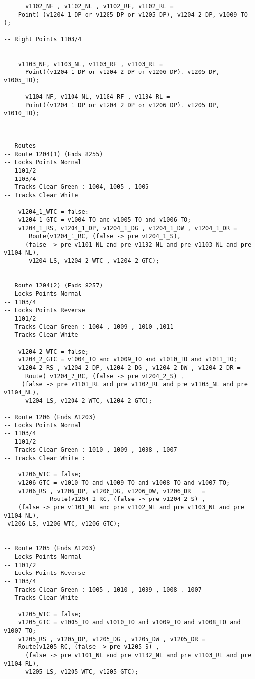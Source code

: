 \begin{verbatim}
      v1102_NF , v1102_NL , v1102_RF, v1102_RL =
 	Point( (v1204_1_DP or v1205_DP or v1205_DP), v1204_2_DP, v1009_TO );

-- Right Points 1103/4


	v1103_NF, v1103_NL, v1103_RF , v1103_RL =
      Point((v1204_1_DP or v1204_2_DP or v1206_DP), v1205_DP, v1005_TO);
	
      v1104_NF, v1104_NL, v1104_RF , v1104_RL =
      Point((v1204_1_DP or v1204_2_DP or v1206_DP), v1205_DP,  v1010_TO);

	
	
-- Routes
-- Route 1204(1) (Ends 8255)
-- Locks Points Normal 
-- 1101/2 
-- 1103/4
-- Tracks Clear Green : 1004, 1005 , 1006
-- Tracks Clear White

	v1204_1_WTC = false;
	v1204_1_GTC = v1004_TO and v1005_TO and v1006_TO;
	v1204_1_RS, v1204_1_DP, v1204_1_DG , v1204_1_DW , v1204_1_DR =
       Route(v1204_1_RC, (false -> pre v1204_1_S), 
      (false -> pre v1101_NL and pre v1102_NL and pre v1103_NL and pre v1104_NL),
       v1204_LS, v1204_2_WTC , v1204_2_GTC);


-- Route 1204(2) (Ends 8257)
-- Locks Points Normal
-- 1103/4
-- Locks Points Reverse
-- 1101/2
-- Tracks Clear Green : 1004 , 1009 , 1010 ,1011
-- Tracks Clear White

	v1204_2_WTC = false;
	v1204_2_GTC = v1004_TO and v1009_TO and v1010_TO and v1011_TO;
	v1204_2_RS , v1204_2_DP, v1204_2_DG , v1204_2_DW , v1204_2_DR = 
      Route( v1204_2_RC, (false -> pre v1204_2_S) ,
     (false -> pre v1101_RL and pre v1102_RL and pre v1103_NL and pre v1104_NL),
      v1204_LS, v1204_2_WTC, v1204_2_GTC);

-- Route 1206 (Ends A1203)
-- Locks Points Normal
-- 1103/4
-- 1101/2
-- Tracks Clear Green : 1010 , 1009 , 1008 , 1007
-- Tracks Clear White :

	v1206_WTC = false;
	v1206_GTC = v1010_TO and v1009_TO and v1008_TO and v1007_TO;
	v1206_RS , v1206_DP, v1206_DG, v1206_DW, v1206_DR	=
             Route(v1204_2_RC, (false -> pre v1204_2_S) ,
    (false -> pre v1101_NL and pre v1102_NL and pre v1103_NL and pre v1104_NL),
 v1206_LS, v1206_WTC, v1206_GTC);


-- Route 1205 (Ends A1203)
-- Locks Points Normal
-- 1101/2
-- Locks Points Reverse
-- 1103/4
-- Tracks Clear Green : 1005 , 1010 , 1009 , 1008 , 1007
-- Tracks Clear White

	v1205_WTC = false;
	v1205_GTC = v1005_TO and v1010_TO and v1009_TO and v1008_TO and v1007_TO;
	v1205_RS , v1205_DP, v1205_DG , v1205_DW , v1205_DR =
  	Route(v1205_RC, (false -> pre v1205_S) , 
      (false -> pre v1101_NL and pre v1102_NL and pre v1103_RL and pre v1104_RL),
      v1205_LS, v1205_WTC, v1205_GTC);


\end{verbatim}
